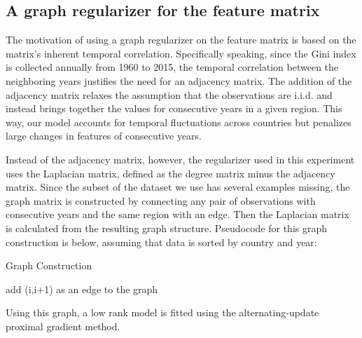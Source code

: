 \documentclass[a4paper]{article}
\begin{document}
\subsection{A graph regularizer for the feature matrix}
The motivation of using a graph regularizer on the feature matrix is based on the matrix's inherent temporal correlation. Specifically speaking, since the Gini index is collected annually from 1960 to 2015, the temporal correlation between the neighboring years justifies the need for an adjacency matrix. The addition of the adjacency matrix relaxes the assumption that the observations are i.i.d. and instead brings together the values for consecutive years in a given region. This way, our model accounts for temporal fluctuations across countries but penalizes large changes in features of consecutive years.

Instead of the adjacency matrix, however, the regularizer used in this experiment uses the Laplacian matrix, defined as the degree matrix minus the adjacency matrix. Since the subset of the dataset we use has several examples missing, the graph matrix is constructed by connecting any pair of observations with consecutive years and the same region with an edge. Then the Laplacian matrix is calculated from the resulting graph structure. Pseudocode for this graph construction is below, assuming that data is sorted by country and year:

\begin{algorithm}
\caption{Graph Construction}
\begin{algorithmic}[1]
\STATE add (i,i+1) as an edge to the graph
\ENDIF
\ENDIF
\ENDFOR
\end{algorithmic}
\end{algorithm}


Using this graph, a low rank model is fitted using the alternating-update proximal gradient method.
\end{document}
